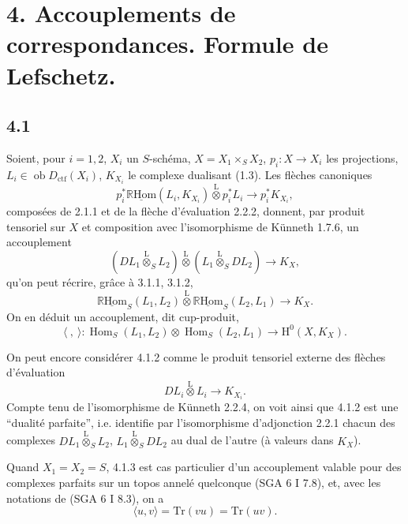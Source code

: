\documentclass[11pt]{article}
\renewcommand{\H}{\mathrm{H}}
\DeclareMathOperator{\Hom}{Hom}
\newcommand{\R}{\mathbb{R}}\newcommand{\RHomCore}{\mathbb{R}\mathrm{Hom}}
\newcommand{\ob}{\operatorname{ob}}
\providecommand{\RHom}{\RHomCore}
\providecommand{\uRHom}{\underline{\RHom}}
\providecommand{\Dctf}{D_{\mathrm{ctf}}}
\providecommand{\Dctf}{D_{\mathrm{ctf}}}
\providecommand{\RHom}{\RHomCore}
\providecommand{\Hom}{\operatorname{Hom}}
\providecommand{\ob}{\operatorname{ob}}
\providecommand{\RHom}{\R\mathcal{H}om}
\providecommand{\R}{\mathrm R}
\providecommand{\RHom}{\RHomCore}
\providecommand{\Hom}{\operatorname{Hom}}
\begin{document}
\section*{4. Accouplements de correspondances. Formule de Lefschetz.}

\subsection*{4.1}
Soient, pour $i=1,2$, $X_i$ un $S$-schéma, $X=X_1\times_SX_2$, $p_i:X\to X_i$ les projections, $L_i\in\ob\Dctf(X_i)$, $K_{X_i}$ le complexe dualisant (1.3). Les flèches canoniques
\begin{equation}
p_i^*\uRHom(L_i,K_{X_i})\overset{\mathrm{L}}{\otimes}p_i^*L_i
\longrightarrow p_i^*K_{X_i},
\tag{4.1.1}
\end{equation}
composées de 2.1.1 et de la flèche d'évaluation 2.2.2, donnent, par produit tensoriel sur $X$ et composition avec l'isomorphisme de Künneth 1.7.6, un accouplement
\begin{equation}
(DL_1\overset{\mathrm{L}}{\otimes}_S L_2)\overset{\mathrm{L}}{\otimes}(L_1\overset{\mathrm{L}}{\otimes}_S DL_2)
\longrightarrow K_X,
\tag{4.1.2}
\end{equation}
qu'on peut récrire, grâce à 3.1.1, 3.1.2,
\begin{equation}
\uRHom_S(L_1,L_2)\overset{\mathrm{L}}{\otimes}\uRHom_S(L_2,L_1)
\longrightarrow K_X.
\tag{4.1.3}
\end{equation}
On en déduit un accouplement, dit cup-produit,
\begin{equation}
\langle\ ,\ \rangle:\Hom_S(L_1,L_2)\otimes\Hom_S(L_2,L_1)
\longrightarrow \H^0(X,K_X).
\tag{4.1.4}
\end{equation}

On peut encore considérer 4.1.2 comme le produit tensoriel externe des flèches d'évaluation
\[
DL_i\overset{\mathrm{L}}{\otimes}L_i\longrightarrow K_{X_i}.
\]
Compte tenu de l'isomorphisme de Künneth 2.2.4, on voit ainsi que 4.1.2 est une ``dualité parfaite'', i.e. identifie par l'isomorphisme d'adjonction 2.2.1 chacun des complexes $DL_1\overset{\mathrm{L}}{\otimes}_S L_2$, $L_1\overset{\mathrm{L}}{\otimes}_S DL_2$ au dual de l'autre (à valeurs dans $K_X$).

Quand $X_1=X_2=S$, 4.1.3 est cas particulier d'un accouplement valable pour des complexes parfaits sur un topos annelé quelconque (SGA 6 I 7.8), et, avec les notations de (SGA 6 I 8.3), on a
\begin{equation}
\langle u,v\rangle=\mathrm{Tr}(vu)=\mathrm{Tr}(uv).
\tag{4.1.5}
\end{equation}
\end{document}
